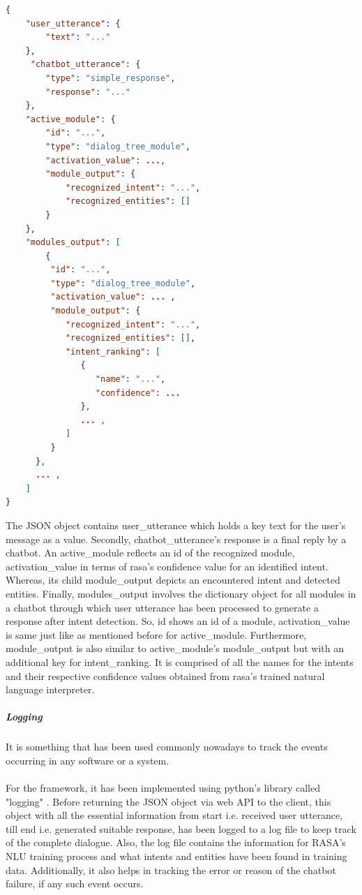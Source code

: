 \begin{lstlisting}[language=json, firstnumber=1]
{
    "user_utterance": {
        "text": "..."
    }, 
     "chatbot_utterance": {
        "type": "simple_response", 
        "response": "..."
    },
    "active_module": {
        "id": "...", 
        "type": "dialog_tree_module", 
        "activation_value": ..., 
        "module_output": {
            "recognized_intent": "...", 
            "recognized_entities": []
        }
    }, 
    "modules_output": [
        {
         "id": "...",
         "type": "dialog_tree_module",
         "activation_value": ... ,
         "module_output": {
            "recognized_intent": "...",
            "recognized_entities": [],
            "intent_ranking": [
               {
                  "name": "...",
                  "confidence": ...
               },
               ... ,
            ]
         }
      },
      ... ,
    ]
}
\end{lstlisting}
The JSON object contains user\_utterance which holds a key text for the user's message as a value. Secondly, chatbot\_utterance's response is a final reply by a chatbot. An active\_module reflects an id of the recognized module, activation\_value in terms of rasa's confidence value for an identified intent. Whereas, its child module\_output depicts an encountered intent and detected entities. Finally, modules\_output involves the dictionary object for all modules in a chatbot through which user utterance has been processed to generate a response after intent detection. So, id shows an id of a module, activation\_value is same just like as mentioned before for active\_module. Furthermore, module\_output is also similar to active\_module's module\_output but with an additional key for intent\_ranking. It is comprised of all the names for the intents and their respective confidence values obtained from rasa's trained natural language interpreter.

\subparagraph*{Logging}
It is something that has been used commonly nowadays to track the events occurring in any software or a system. 
\\~\\
For the framework, it has been implemented using python's library called "logging" \cite{logging}. Before returning the JSON object via web API to the client, this object with all the essential information from start i.e. received user utterance, till end i.e. generated suitable response, has been logged to a log file to keep track of the complete dialogue. Also, the log file contains the information for RASA's NLU training process and what intents and entities have been found in training data. Additionally, it also helps in tracking the error or reason of the chatbot failure, if any such event occurs.  


